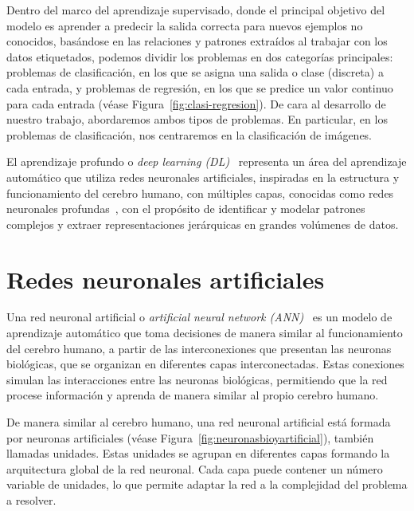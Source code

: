 Dentro del marco del aprendizaje supervisado, donde el principal objetivo del modelo es aprender a predecir la salida correcta para nuevos ejemplos no conocidos, basándose en las relaciones y patrones extraídos al trabajar con los datos etiquetados, podemos dividir los problemas en dos categorías principales: problemas de clasificación, en los que se asigna una salida o clase (discreta) a cada entrada, y problemas de regresión, en los que se predice un valor continuo para cada entrada (véase Figura~\ref{fig:clasi-regresion}). De cara al desarrollo de nuestro trabajo, abordaremos ambos tipos de problemas. En particular, en los problemas de clasificación, nos centraremos en la clasificación de imágenes.

El aprendizaje profundo o \emph{deep learning (DL)}~\cite{Bishop2023, Prince2023, LeCun2015} representa un área del aprendizaje automático que utiliza redes neuronales artificiales, inspiradas en la estructura y funcionamiento del cerebro humano, con múltiples capas, conocidas como redes neuronales profundas~\cite{Goodfellow2016, Schmidhuber2015}, con el propósito de identificar y modelar patrones complejos y extraer representaciones jerárquicas en grandes volúmenes de datos.

\section{Redes neuronales artificiales}\label{sec:redes-neuronales-artificiales}

Una red neuronal artificial o \emph{artificial neural network (ANN)}~\cite{Bishop1995, Ripley1996} es un modelo de aprendizaje automático que toma decisiones de manera similar al funcionamiento del cerebro humano, a partir de las interconexiones que presentan las neuronas biológicas, que se organizan en diferentes capas interconectadas. Estas conexiones simulan las interacciones entre las neuronas biológicas, permitiendo que la red procese información y aprenda de manera similar al propio cerebro humano.

De manera similar al cerebro humano, una red neuronal artificial está formada por neuronas artificiales (véase Figura~\ref{fig:neuronasbioyartificial}), también llamadas unidades. Estas unidades se agrupan en diferentes capas formando la arquitectura global de la red neuronal. Cada capa puede contener un número variable de unidades, lo que permite adaptar la red a la complejidad del problema a resolver.

